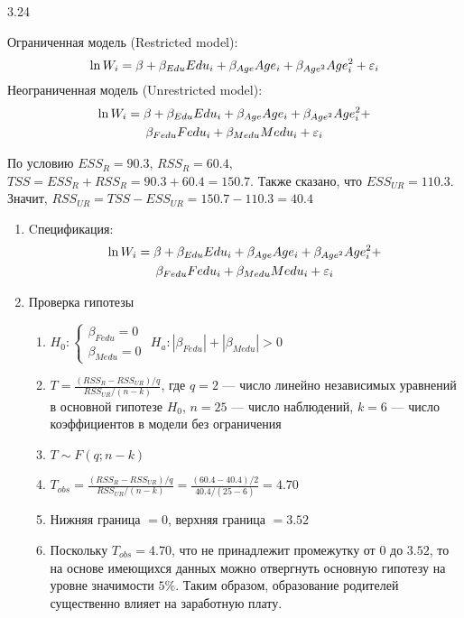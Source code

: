 \begin{solution}{{3.24}}

Ограниченная модель (Restricted model):
\[
\ln W_i = \beta + \beta_{Edu}Edu_i + \beta_{Age}Age_i + \beta_{Age^2}Age^2_i + \varepsilon_i
\]
Неограниченная модель (Unrestricted model):
\begin{multline*}
\ln W_i = \beta + \beta_{Edu}Edu_i + \beta_{Age}Age_i + \beta_{Age^2}Age^2_i + \\
\beta_{Fedu}Fedu_i + \beta_{Medu}Medu_i + \varepsilon_i
\end{multline*}

По условию $ESS_R = 90.3$, $RSS_R = 60.4$, $TSS = ESS_R + RSS_R = 90.3 + 60.4 = 150.7.$ Также сказано, что $ESS_{UR} = 110.3$. Значит, $RSS_{UR} = TSS - ESS_{UR} = 150.7 - 110.3 = 40.4$
\begin{enumerate}
\item Cпецификация:
\begin{multline*}
\ln W_i = \beta + \beta_{Edu}Edu_i + \beta_{Age}Age_i + \beta_{Age^2}Age^2_i + \\
\beta_{Fedu}Fedu_i + \beta_{Medu}Medu_i + \varepsilon_i
\end{multline*}
\item Проверка гипотезы
\begin{enumerate}
\item $H_0: \begin{cases} \beta_{Fedu} = 0  \\  \beta_{Medu} = 0 \end{cases}$
$H_a: |\beta_{Fedu}| + |\beta_{Medu}| > 0$
\item $T = \frac{(RSS_{R} - RSS_{UR})/q}{RSS_{UR}/(n - k)}$, где $q = 2$ — число линейно независимых уравнений в основной гипотезе $H_0$, $n = 25$ — число наблюдений, $k = 6$ — число коэффициентов в модели без ограничения
\item $T \sim F(q; n - k)$
\item $T_{obs} = \frac{(RSS_{R} - RSS_{UR})/q}{RSS_{UR}/(n - k)} = \frac{(60.4 - 40.4)/2}{40.4/(25 - 6)} = 4.70$
\item Нижняя граница $= 0$, верхняя граница $= 3.52$
\item Поскольку $T_{obs} = 4.70$, что не принадлежит промежутку от $0$ до $3.52$, то на основе имеющихся данных можно отвергнуть основную гипотезу на уровне значимости $5\%$. Таким образом, образование родителей существенно влияет на заработную плату.
\end{enumerate}
\end{enumerate}

\end{solution}
